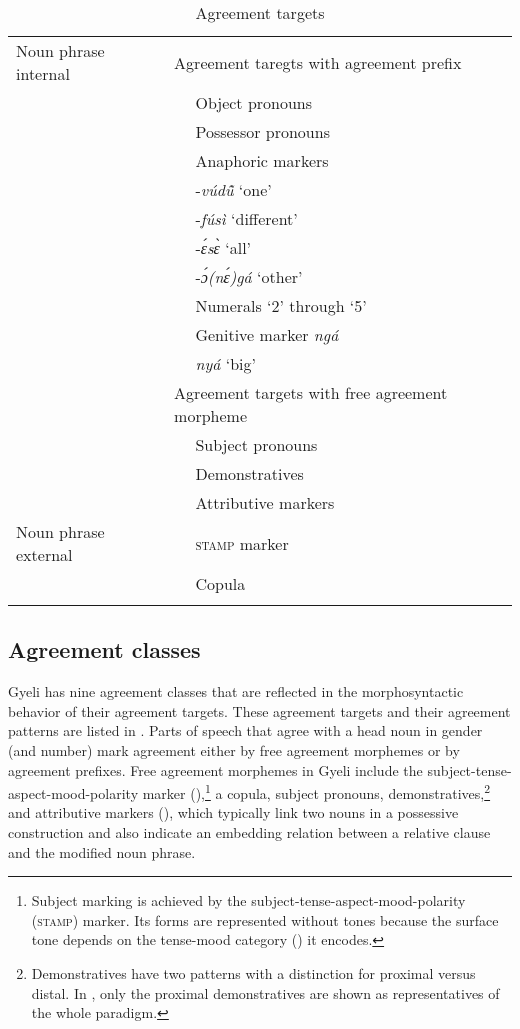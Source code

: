 \begin{table}
\begin{tabularx}{\textwidth}{Xl}
 \lsptoprule
{Noun phrase internal} & Agreement taregts with agreement prefix \\
& ~~	Object pronouns \\
& ~~	Possessor pronouns \\
& ~~	Anaphoric markers \\
& ~~	-{\itshape vúdũ̂} `one' \\
& ~~	-{\itshape fúsì} `different' \\
& ~~	-{\itshape ɛ́sɛ̀} `all' \\
& ~~	-{\itshape ɔ́(nɛ́)gá} `other' \\
& ~~	Numerals `2' through `5' \\
& ~~	Genitive marker {\itshape ngá} \\
& ~~	{\itshape nyá} `big' \\
& Agreement targets with free agreement morpheme \\
& ~~	Subject pronouns \\
& ~~	Demonstratives \\
& ~~	Attributive markers \\  \midrule
{Noun phrase external} &   ~~	\textsc{stamp} marker \\
& ~~	Copula \\
 \lspbottomrule
\end{tabularx}
\caption{Agreement targets}
\label{Tab:AGRtargetx}
\end{table}




\subsection{Agreement classes}
\label{sec:AGR}

Gyeli has nine agreement classes that are reflected in the morphosyntactic behavior of their agreement targets. These agreement targets and their agreement patterns are listed in .  Parts of speech that agree with a head noun in gender (and number) mark agreement either by free agreement morphemes or by agreement prefixes. Free agreement morphemes in Gyeli include the subject-tense-aspect-mood-polarity marker (\STAMP),\footnote{Subject marking is achieved by the subject-tense-aspect-mood-polarity (\textsc{stamp}) marker. Its forms are represented without tones because the surface tone depends on the tense-mood category () it encodes.} a copula, subject pronouns, demonstratives,\footnote{Demonstratives have two patterns with a distinction for proximal versus distal. In , only the proximal demonstratives are shown as representatives of the whole paradigm.} and attributive markers (), which typically link two nouns in a possessive construction and also indicate an embedding relation between a relative clause and the modified noun phrase. 

